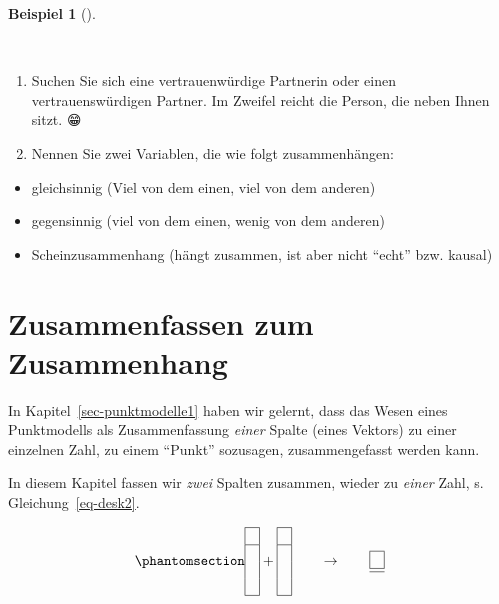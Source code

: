 \documentclass[
  letterpaper,
]{scrbook}
\providecommand{\tightlist}{%
  \setlength{\itemsep}{0pt}\setlength{\parskip}{0pt}}\usepackage{longtable,booktabs,array}
\theoremstyle{definition}
\newtheorem{example}{Beispiel}[chapter]
\theoremstyle{definition}
\theoremstyle{definition}
\theoremstyle{remark}
\begin{document}
\begin{example}[]\protect\hypertarget{exm-zsgh-studis}{}\label{exm-zsgh-studis}

~

\begin{enumerate}
\def\labelenumi{\arabic{enumi}.}
\tightlist
\item
  Suchen Sie sich eine vertrauenwürdige Partnerin oder einen
  vertrauenswürdigen Partner. Im Zweifel reicht die Person, die neben
  Ihnen sitzt. {😁}
\item
  Nennen Sie zwei Variablen, die wie folgt zusammenhängen:
\end{enumerate}

\begin{itemize}
\tightlist
\item
  gleichsinnig (Viel von dem einen, viel von dem anderen)
\item
  gegensinnig (viel von dem einen, wenig von dem anderen)
\item
  Scheinzusammenhang (hängt zusammen, ist aber nicht ``echt'' bzw.
  kausal)
\end{itemize}

\end{example}

\section{Zusammenfassen zum
Zusammenhang}\label{zusammenfassen-zum-zusammenhang}

In Kapitel~\ref{sec-punktmodelle1} haben wir gelernt, dass das Wesen
eines Punktmodells als Zusammenfassung \emph{einer} Spalte (eines
Vektors) zu einer einzelnen Zahl, zu einem ``Punkt'' sozusagen,
zusammengefasst werden kann.

In diesem Kapitel fassen wir \emph{zwei} Spalten zusammen, wieder zu
\emph{einer} Zahl, s. Gleichung~\ref{eq-desk2}.

\begin{equation}\phantomsection\label{eq-desk2}{\begin{array}{|c|} \hline \\ \hline \\\\\\ \hline \end{array} + \begin{array}{|c|} \hline \\ \hline \\\\\\ \hline \end{array} \qquad \rightarrow \qquad \begin{array}{|c|} \hline \\ \hline  \hline \end{array}}\end{equation}
\end{document}
